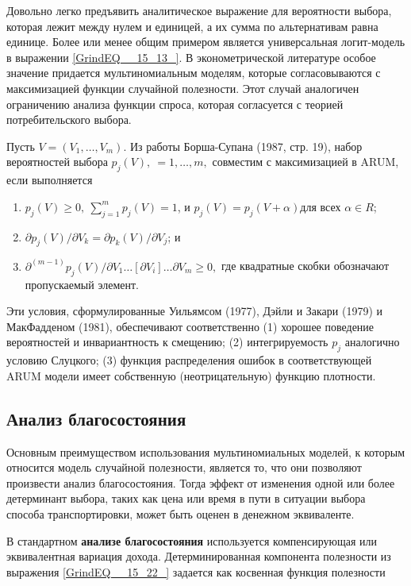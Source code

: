 Довольно легко предъявить аналитическое выражение для вероятности выбора, которая лежит между нулем и единицей, а их сумма по альтернативам равна единице. Более или менее общим примером является универсальная логит-модель в выражении \eqref{GrindEQ__15_13_}. В эконометрической литературе особое значение придается  мультиномиальным моделям, которые согласовываются с максимизацией функции случайной полезности. Этот случай аналогичен ограничению анализа функции спроса, которая согласуется с теорией потребительского выбора. 

Пусть $V=\left(V_1,\dots ,V_m\right).$ Из работы Борша-Супана (1987, стр. 19), набор вероятностей выбора $p_j\left(V\right),\ =1,\dots ,m,$ совместим с максимизацией в ARUM, если выполняется

\begin{enumerate}
\item  $p_j\left(V\right)\ge 0,\ \sum^m_{j=1}{p_j\left(V\right)=1}$, и $p_j(V)=p_j(V+\alpha )$для всех $\alpha \in R$;

\item  ${\partial p_j(V)}/{\partial V_k}={\partial p_k(V)}/{\partial V_j}$; и

\item  ${{\partial }^{\left(m-1\right)}p_j(V)}/{\partial V_1\dots \left[\partial V_i\right]\dots \partial V_m\ge 0,}$ где квадратные скобки обозначают пропускаемый элемент.
\end{enumerate}

Эти условия, сформулированные Уильямсом (1977), Дэйли и Закари (1979) и МакФадденом (1981), обеспечивают соответственно (1) хорошее поведение вероятностей и инвариантность к смещению; (2) интегрируемость $p_j$ аналогично условию Слуцкого; (3) функция распределения ошибок в соответствующей ARUM модели имеет собственную (неотрицательную) функцию плотности.

\subsection{Анализ благосостояния}

Основным преимуществом использования мультиномиальных моделей, к которым относится модель случайной полезности, является то, что они позволяют произвести анализ благосостояния. Тогда эффект от изменения одной или более детерминант выбора, таких как цена или время в пути в ситуации выбора способа транспортировки, может быть оценен в денежном эквиваленте.

В стандартном \textbf{анализе благосостояния} используется компенсирующая или эквивалентная вариация дохода. Детерминированная компонента полезности из выражения \eqref{GrindEQ__15_22_} задается как косвенная функция полезности

